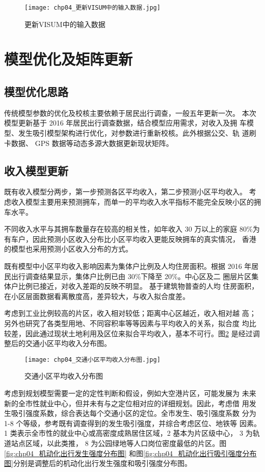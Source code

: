 \begin{figure}[!ht]
  \centering
  \texttt{[image: chp04\_更新VISUM中的输入数据.jpg]}
  \caption{更新VISUM中的输入数据\label{fig:chp04_更新VISUM中的输入数据} }
\end{figure}

\section{模型优化及矩阵更新}
\subsection{模型优化思路}
传统模型参数的优化及校核主要依赖于居民出行调查，一般五年更新一次。
本次模型更新基于 2016 年居民出行调查数据，结合模型应用需求，对收入及拥
车模型、发生吸引模型架构进行优化，对参数进行重新校核。此外根据公交、轨
道刷卡数据、 GPS 数据等动态多源大数据更新现状矩阵。

\subsection{收入模型更新}
既有收入模型分两步，第一步预测各区平均收入，第二步预测小区平均收入。
考虑收入模型主要用来预测拥车，而单一的平均收入水平指标不能完全反映小区的拥车水平。

不同收入水平与其拥车数量存在较高的相关性，如年收入 30 万以上的家庭
80\%为有车户，因此预测小区收入分布比小区平均收入更能反映拥车的真实情况，
香港的模型也采用预测小区收入分布的方式。

既有模型中小区平均收入影响因素为集体户比例及人均住房面积。根据
2016 年居民出行调查结果显示，集体户比例已由 30\%下降至 20\%。中心区及二
圈层片区集体户比例已接近，对收入差距的反映不明显。 基于建筑物普查的人均
住房面积，在小区层面数据看离散度高，差异较大，与收入拟合度差。

考虑到工业比例较高的片区，收入相对较低；距离中心区越近，收入相对越
高；另外也研究了各类型用地、不同容积率等等因素与平均收入的关系，拟合度
均比较差，因此通过现状土地利用及区位来拟合平均收入，基本不可行。图\ref{fig:chp04_交通小区平均收入分布图}
是经过调整后的交通小区平均收入分布图。

\begin{figure}[!ht]
  \centering
  \texttt{[image: chp04\_交通小区平均收入分布图.jpg]}
  \caption{交通小区平均收入分布图\label{fig:chp04_交通小区平均收入分布图} }
\end{figure}


考虑到规划模型需要一定的定性判断和假设，例如大空港片区，可能发展为
未来新的全市性就业中心，但并未有与之定位相对应的详细规划。因此，考虑借
用发生吸引强度系数，综合表达每个交通小区的定位。全市发生、吸引强度系数
分为 1-8 个等级，参考既有调查得到的发生吸引强度，并综合考虑区位、地铁等
因素。1 类表示全市性的就业中心或高密度成熟居住区域，2 基本为片区级中心，
3 为轨道站点区域，以此类推， 8 为公园绿地等人口岗位密度最低的片区。图\ref{fig:chp04_机动化出行发生强度分布图}
和图\ref{fig:chp04_机动化出行吸引强度分布图}分别是调整后的机动化出行发生强度和吸引强度分布图。

